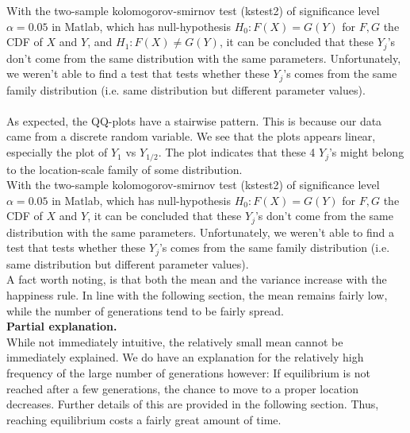 With the two-sample kolomogorov-smirnov test (kstest2) of significance level $\alpha=0.05$ in Matlab, which has null-hypothesis $H_0:F(X)=G(Y)$ for $F,G$ the CDF of $X$ and $Y$, and $H_1: F(X)\neq G(Y)$, it can be concluded that these $Y_j$'s don't come from the same distribution with the same parameters. Unfortunately, we weren't able to find a test that tests whether these $Y_j$'s comes from the same family distribution (i.e. same distribution but different parameter values).\\
\\


As expected, the QQ-plots have a stairwise pattern. 
This is because our data came from a discrete random variable. 
We see that the plots appears linear, especially the plot of $Y_{1}$ vs $Y_{1/2}$. 
The plot indicates that these 4 $Y_j$'s might belong to the location-scale family of some distribution.\\

With the two-sample kolomogorov-smirnov test (kstest2) of significance level $\alpha=0.05$ in Matlab, which has null-hypothesis $H_0:F(X)=G(Y)$ for $F,G$ the CDF of $X$ and $Y$, it can be concluded that these $Y_j$'s don't come from the same distribution with the same parameters. 
Unfortunately, we weren't able to find a test that tests whether these $Y_j$'s comes from the same family distribution (i.e. same distribution but different parameter values).\\

A fact worth noting, is that both the mean and the variance increase with the happiness rule. In line with the following section, the mean remains fairly low, while the number of generations tend to be fairly spread.\\

\textbf{Partial explanation.} \\
While not immediately intuitive, the relatively small mean cannot be immediately explained. We do have an explanation for the relatively high frequency of the large number of generations however: 
If equilibrium is not reached after a few generations, the chance to move to a proper location decreases. 
Further details of this are provided in the following section. 
Thus, reaching equilibrium costs a fairly great amount of time.


